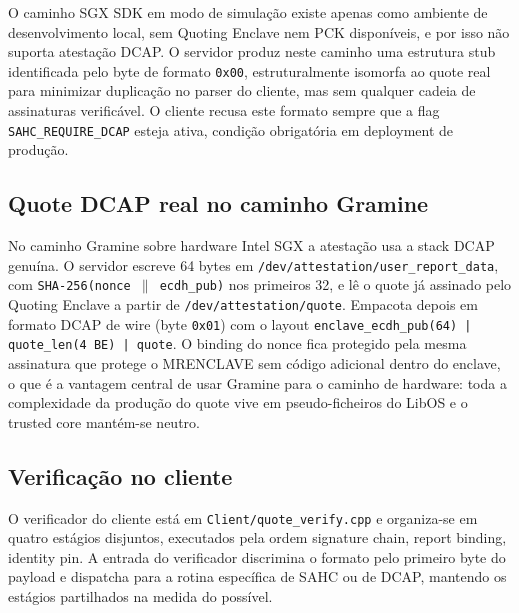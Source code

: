 O caminho SGX SDK em modo de simulação existe apenas como ambiente de desenvolvimento local, sem Quoting Enclave nem PCK disponíveis, e por isso não suporta atestação DCAP. O servidor produz neste caminho uma estrutura stub identificada pelo byte de formato \texttt{0x00}, estruturalmente isomorfa ao quote real para minimizar duplicação no parser do cliente, mas sem qualquer cadeia de assinaturas verificável. O cliente recusa este formato sempre que a flag \texttt{SAHC\_REQUIRE\_DCAP} esteja ativa, condição obrigatória em deployment de produção.

\subsection{Quote DCAP real no caminho Gramine}

No caminho Gramine sobre hardware Intel SGX a atestação usa a stack DCAP genuína. O servidor escreve 64 bytes em \texttt{/dev/attestation/user\_report\_data}, com \texttt{SHA-256(nonce $\|$ ecdh\_pub)} nos primeiros 32, e lê o quote já assinado pelo Quoting Enclave a partir de \texttt{/dev/attestation/quote}. Empacota depois em formato DCAP de wire (byte \texttt{0x01}) com o layout \texttt{enclave\_ecdh\_pub(64) | quote\_len(4 BE) | quote}. O binding do nonce fica protegido pela mesma assinatura que protege o MRENCLAVE sem código adicional dentro do enclave, o que é a vantagem central de usar Gramine para o caminho de hardware: toda a complexidade da produção do quote vive em pseudo-ficheiros do LibOS e o trusted core mantém-se neutro.

\subsection{Verificação no cliente}

O verificador do cliente está em \texttt{Client/quote\_verify.cpp} e organiza-se em quatro estágios disjuntos, executados pela ordem signature chain, report binding, identity pin. A entrada do verificador discrimina o formato pelo primeiro byte do payload e dispatcha para a rotina específica de SAHC ou de DCAP, mantendo os estágios partilhados na medida do possível.

